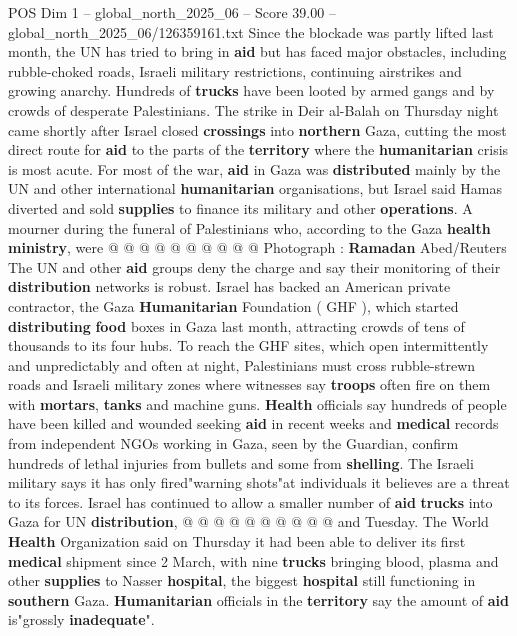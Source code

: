 \begin{textsample}{POS Dim 1 – global\_north\_2025\_06 – Score 39.00 – global\_north\_2025\_06/126359161.txt}
Since the blockade was partly lifted last month, the UN has tried to bring in \textbf{aid} but has faced major obstacles, including rubble-choked roads, Israeli military restrictions, continuing airstrikes and growing anarchy.
Hundreds of \textbf{trucks} have been looted by armed gangs and by crowds of desperate Palestinians.
The strike in Deir al-Balah on Thursday night came shortly after Israel closed \textbf{crossings} into \textbf{northern} Gaza, cutting the most direct route for \textbf{aid} to the parts of the \textbf{territory} where the \textbf{humanitarian} crisis is most acute.
For most of the war, \textbf{aid} in Gaza was \textbf{distributed} mainly by the UN and other international \textbf{humanitarian} organisations, but Israel said Hamas diverted and sold \textbf{supplies} to finance its military and other \textbf{operations}.
A mourner during the funeral of Palestinians who, according to the Gaza \textbf{health} \textbf{ministry}, were @ @ @ @ @ @ @ @ @ @ Photograph : \textbf{Ramadan} Abed/Reuters The UN and other \textbf{aid} groups deny the charge and say their monitoring of their \textbf{distribution} networks is robust.
Israel has backed an American private contractor, the Gaza \textbf{Humanitarian} Foundation ( GHF ), which started \textbf{distributing} \textbf{food} boxes in Gaza last month, attracting crowds of tens of thousands to its four hubs.
To reach the GHF sites, which open intermittently and unpredictably and often at night, Palestinians must cross rubble-strewn roads and Israeli military zones where witnesses say \textbf{troops} often fire on them with \textbf{mortars}, \textbf{tanks} and machine guns. \textbf{Health} officials say hundreds of people have been killed and wounded seeking \textbf{aid} in recent weeks and \textbf{medical} records from independent NGOs working in Gaza, seen by the Guardian, confirm hundreds of lethal injuries from bullets and some from \textbf{shelling}.
The Israeli military says it has only fired"warning shots"at individuals it believes are a threat to its forces.
Israel has continued to allow a smaller number of \textbf{aid} \textbf{trucks} into Gaza for UN \textbf{distribution}, @ @ @ @ @ @ @ @ @ @ and Tuesday.
The World \textbf{Health} Organization said on Thursday it had been able to deliver its first \textbf{medical} shipment since 2 March, with nine \textbf{trucks} bringing blood, plasma and other \textbf{supplies} to Nasser \textbf{hospital}, the biggest \textbf{hospital} still functioning in \textbf{southern} Gaza. \textbf{Humanitarian} officials in the \textbf{territory} say the amount of \textbf{aid} is"grossly \textbf{inadequate}".

\end{textsample}
